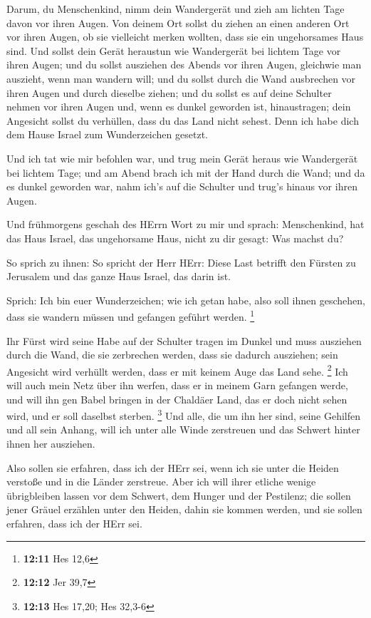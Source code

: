  Darum, du Menschenkind, nimm dein Wandergerät und zieh am
lichten Tage davon vor ihren Augen. Von deinem Ort sollst du ziehen an
einen anderen Ort vor ihren Augen, ob sie vielleicht merken wollten,
dass sie ein ungehorsames Haus sind.  Und sollst dein Gerät
heraustun wie Wandergerät bei lichtem Tage vor ihren Augen; und du
sollst ausziehen des Abends vor ihren Augen, gleichwie man auszieht,
wenn man wandern will;  und du sollst durch die Wand
ausbrechen vor ihren Augen und durch dieselbe ziehen;  und
du sollst es auf deine Schulter nehmen vor ihren Augen und, wenn es
dunkel geworden ist, hinaustragen; dein Angesicht sollst du verhüllen,
dass du das Land nicht sehest. Denn ich habe dich dem Hause Israel zum
Wunderzeichen gesetzt.

 Und ich tat wie mir befohlen war, und trug mein Gerät
heraus wie Wandergerät bei lichtem Tage; und am Abend brach ich mit der
Hand durch die Wand; und da es dunkel geworden war, nahm ich's auf die
Schulter und trug's hinaus vor ihren Augen.

 Und frühmorgens geschah des HErrn Wort zu mir und sprach:
 Menschenkind, hat das Haus Israel, das ungehorsame Haus,
nicht zu dir gesagt: Was machst du?

 So sprich zu ihnen: So spricht der Herr HErr: Diese Last
betrifft den Fürsten zu Jerusalem und das ganze Haus Israel, das darin
ist.

 Sprich: Ich bin euer Wunderzeichen; wie ich getan habe,
also soll ihnen geschehen, dass sie wandern müssen und gefangen geführt
werden. \footnote{\textbf{12:11} Hes 12,6}

 Ihr Fürst wird seine Habe auf der Schulter tragen im
Dunkel und muss ausziehen durch die Wand, die sie zerbrechen werden,
dass sie dadurch ausziehen; sein Angesicht wird verhüllt werden, dass er
mit keinem Auge das Land sehe. \footnote{\textbf{12:12} Jer 39,7}
 Ich will auch mein Netz über ihn werfen, dass er in meinem
Garn gefangen werde, und will ihn gen Babel bringen in der Chaldäer
Land, das er doch nicht sehen wird, und er soll daselbst sterben.
\footnote{\textbf{12:13} Hes 17,20; Hes 32,3-6}  Und alle,
die um ihn her sind, seine Gehilfen und all sein Anhang, will ich unter
alle Winde zerstreuen und das Schwert hinter ihnen her ausziehen.

 Also sollen sie erfahren, dass ich der HErr sei, wenn ich
sie unter die Heiden verstoße und in die Länder zerstreue. 
Aber ich will ihrer etliche wenige übrigbleiben lassen vor dem Schwert,
dem Hunger und der Pestilenz; die sollen jener Gräuel erzählen unter den
Heiden, dahin sie kommen werden, und sie sollen erfahren, dass ich der
HErr sei.

